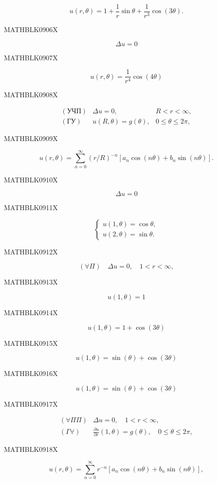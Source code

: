 \documentclass[
  ukrainian,
]{article}
\begin{document}
\[
u(r, \theta) = 1 + \frac{1}{r} \sin \theta + \frac{1}{r^3} \cos (3\theta).
\]

MATHBLK0906X

\[
\Delta u = 0
\]

MATHBLK0907X

\[
u(r, \theta) = \frac{1}{r^4} \cos(4\theta)
\]

MATHBLK0908X

\[
\begin{array}{llll} (\text{УЧП}) & \Delta u = 0, & R < r < \infty, \\ (\text{ГУ}) & u (R, \theta) = g (\theta), & 0 \leqslant \theta \leqslant 2\pi, \end{array}
\]

MATHBLK0909X

\[
u(r, \theta) = \sum_{n=0}^{\infty} (r/R)^{-n} [a_n \cos(n\theta) + b_n \sin(n\theta)].
\]

MATHBLK0910X

\[
\Delta u = 0
\]

MATHBLK0911X

\[
\begin{cases} u(1, \theta) = \cos \theta, \\ u(2, \theta) = \sin \theta. \end{cases}
\]

MATHBLK0912X

\[
(\forall \Pi) \quad \Delta u = 0, \quad 1 < r < \infty,
\]

MATHBLK0913X

\[
u(1, \theta) = 1
\]

MATHBLK0914X

\[
u(1, \theta) = 1 + \cos(3\theta)
\]

MATHBLK0915X

\[
u(1, \theta) = \sin(\theta) + \cos(3\theta)
\]

MATHBLK0916X

\[
u(1, \theta) = \sin(\theta) + \cos(3\theta)
\]

MATHBLK0917X

\[
\begin{array}{llll} (\forall \Pi \Pi) & \Delta u = 0, \quad 1 < r < \infty, \\ (\Gamma \forall) & \frac{\partial u}{\partial r} (1, \theta) = g(\theta), \quad 0 \leqslant \theta \leqslant 2\pi, \end{array}
\]

MATHBLK0918X

\[
u(r, \theta) = \sum_{n=0}^{\infty} r^{-n} [a_n \cos(n\theta) + b_n \sin(n\theta)],
\]
\end{document}
